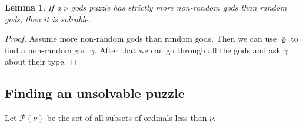 \documentclass[twoside,twocolumn,a4paper,11pt]{article}
\newtheorem{lemma}[theorem]{Lemma}
\theoremstyle{definition}
\begin{document}
%
%
%
%
%


\begin{lemma}
\label{lemma:RsLTNonRsSolvableInf}
If a $\nu$ gods puzzle has strictly more non-random gods than random gods, 
then it is solvable.  
\end{lemma}
\vspace{-1.2em}
\begin{proof}
Assume more non-random gods than random gods. 
Then we can use $\bar{\varrho}$ to find a non-random god
$\gamma$. 
After that we can go through all the gods and ask $\gamma$ about their type.
\end{proof}


\subsection{Finding an unsolvable puzzle}

Let $\mathscr{P}(\nu)$ be the set of all subsets of ordinals less than $\nu$.
\end{document}

